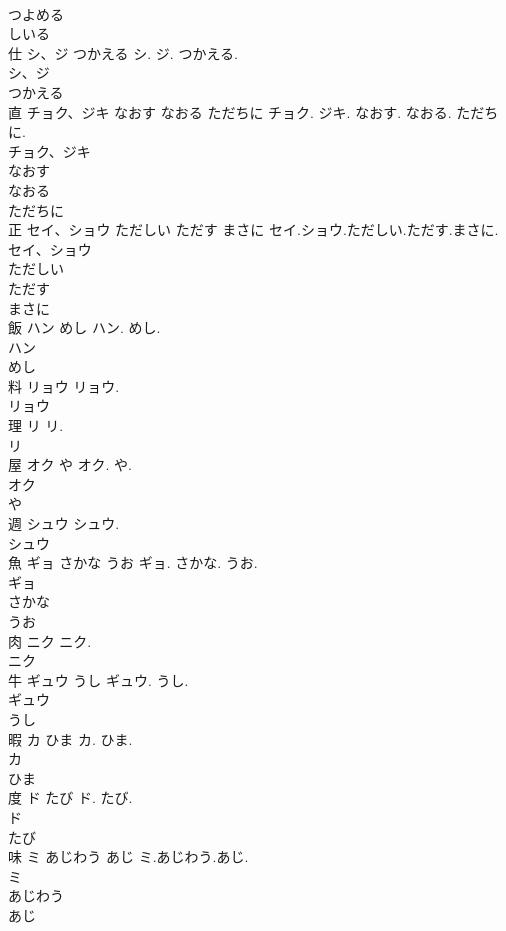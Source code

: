 \documentclass[8pt]{extreport}
\begin{document}
\begin{CJK}{UTF8}{min}
\\	つよめる
\\	しいる
\\	仕	シ、ジ つかえる	シ. ジ. つかえる.	
\\	シ、ジ
\\	つかえる
\\	直	チョク、ジキ なおす なおる ただちに	チョク. ジキ. なおす. なおる. ただちに.	
\\	チョク、ジキ
\\	なおす
\\	なおる
\\	ただちに
\\	正	セイ、ショウ ただしい ただす まさに	セイ.ショウ.ただしい.ただす.まさに.	
\\	セイ、ショウ
\\	ただしい
\\	ただす
\\	まさに
\\	飯	ハン めし	ハン. めし.	
\\	ハン
\\	めし
\\	料	リョウ	リョウ.	
\\	リョウ
\\	理	リ	リ.	
\\	リ
\\	屋	オク や	オク. や.	
\\	オク
\\	や
\\	週	シュウ	シュウ.	
\\	シュウ
\\	魚	ギョ さかな うお	ギョ. さかな. うお.	
\\	ギョ
\\	さかな
\\	うお
\\	肉	ニク	ニク.	
\\	ニク
\\	牛	ギュウ うし	ギュウ. うし.	
\\	ギュウ
\\	うし
\\	暇	カ ひま	カ. ひま.	
\\	カ
\\	ひま
\\	度	ド たび	ド. たび.	
\\	ド
\\	たび
\\	味	ミ あじわう あじ	ミ.あじわう.あじ.	
\\	ミ
\\	あじわう
\\	あじ

\end{CJK}
\end{document}
